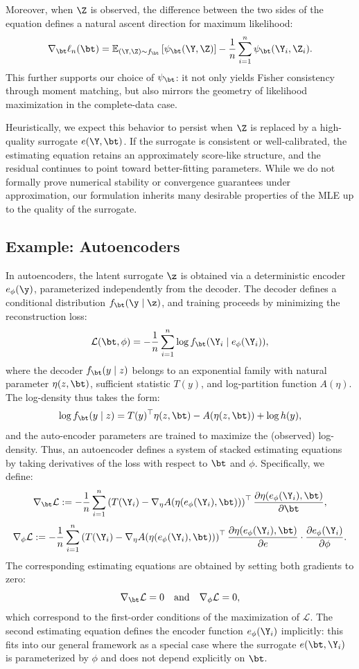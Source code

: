 Moreover, when \(\Z\) is observed, the difference between the two sides of the equation defines a natural ascent direction for maximum likelihood:
\[
\nabla_\bt \ell_n(\bt) 
= 
\mathbb{E}_{(\Y, \Z) \sim f_\bt} \left[ \psi_\bt(\Y, \Z) \right] 
- 
\frac{1}{n} \sum_{i=1}^n \psi_\bt(\Y_i, \Z_i).
\]
This further supports our choice of \(\psi_\bt\): it not only yields Fisher consistency through moment matching, but also mirrors the geometry of likelihood maximization in the complete-data case.

Heuristically, we expect this behavior to persist when \( \Z \) is replaced by a high-quality surrogate \( e(\Y, \bt) \). If the surrogate is consistent or well-calibrated, the estimating equation retains an approximately score-like structure, and the residual continues to point toward better-fitting parameters. While we do not formally prove numerical stability or convergence guarantees under approximation, our formulation inherits many desirable properties of the MLE up to the quality of the surrogate.

\subsection{Example: Autoencoders}

In autoencoders, the latent surrogate \( \z \) is obtained via a deterministic encoder \( e_\phi(\y) \), parameterized independently from the decoder. The decoder defines a conditional distribution \( f_\bt(\y \mid \z) \), and training proceeds by minimizing the reconstruction loss:
\[
\mathcal{L}(\bt, \phi) = -\frac{1}{n} \sum_{i=1}^n \log f_\bt(\Y_i \mid e_\phi(\Y_i)),
\]
where the decoder \( f_\bt(y \mid z) \) belongs to an exponential family with natural parameter \( \eta(z, \bt) \), sufficient statistic \( T(y) \), and log-partition function \( A(\eta) \). The log-density thus takes the form:
\[
\log f_\bt(y \mid z) = T(y)^\top \eta(z, \bt) - A(\eta(z, \bt)) + \log h(y),
\]
and the auto-encoder parameters are trained to maximize the (observed) log-density. Thus, an autoencoder defines a system of stacked estimating equations by taking derivatives of the loss with respect to \( \bt \) and \( \phi \). Specifically, we define:
\[
\nabla_\bt \mathcal{L} := -\frac{1}{n} \sum_{i=1}^n 
\left( T(\Y_i) - \nabla_\eta A(\eta(e_\phi(\Y_i), \bt)) \right)^\top 
\frac{\partial \eta(e_\phi(\Y_i), \bt)}{\partial \bt},
\]
\[
\nabla_\phi \mathcal{L} := -\frac{1}{n} \sum_{i=1}^n 
\left( T(\Y_i) - \nabla_\eta A(\eta(e_\phi(\Y_i), \bt)) \right)^\top 
\frac{\partial \eta(e_\phi(\Y_i), \bt)}{\partial e} \cdot 
\frac{\partial e_\phi(\Y_i)}{\partial \phi}.
\]
The corresponding estimating equations are obtained by setting both gradients to zero:
\[
\nabla_\bt \mathcal{L} = 0 \quad \text{and} \quad \nabla_\phi \mathcal{L} = 0,
\]
which correspond to the first-order conditions of the maximization of $\mathcal L$. The second estimating equation defines the encoder function \( e_\phi(\Y_i) \) implicitly: this fits into our general framework as a special case where the surrogate \( e(\bt, \Y_i) \) is parameterized by \( \phi \) and does not depend explicitly on \( \bt \).

